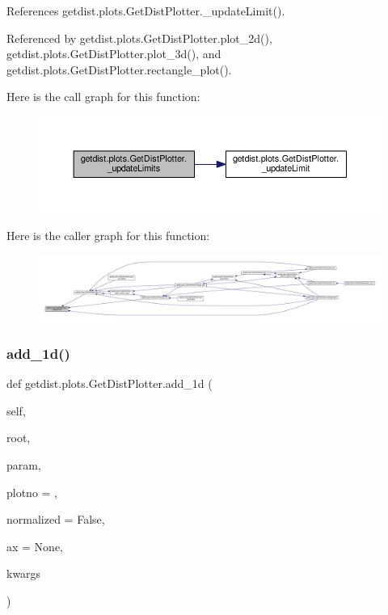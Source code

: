 References getdist.\+plots.\+Get\+Dist\+Plotter.\+\_\+update\+Limit().



Referenced by getdist.\+plots.\+Get\+Dist\+Plotter.\+plot\+\_\+2d(), getdist.\+plots.\+Get\+Dist\+Plotter.\+plot\+\_\+3d(), and getdist.\+plots.\+Get\+Dist\+Plotter.\+rectangle\+\_\+plot().

Here is the call graph for this function\+:
\nopagebreak
\begin{figure}[H]
\begin{center}
\leavevmode
\includegraphics[width=350pt]{classgetdist_1_1plots_1_1GetDistPlotter_aa39ae5fcf55546a48cc27bc838ca04ff_cgraph}
\end{center}
\end{figure}
Here is the caller graph for this function\+:
\nopagebreak
\begin{figure}[H]
\begin{center}
\leavevmode
\includegraphics[width=350pt]{classgetdist_1_1plots_1_1GetDistPlotter_aa39ae5fcf55546a48cc27bc838ca04ff_icgraph}
\end{center}
\end{figure}
\mbox{\label{classgetdist_1_1plots_1_1GetDistPlotter_a2c75c431ff53d33697077671d1da1396}} 
\subsubsection{\texorpdfstring{add\+\_\+1d()}{add\_1d()}}
{\footnotesize\ttfamily def getdist.\+plots.\+Get\+Dist\+Plotter.\+add\+\_\+1d (\begin{DoxyParamCaption}\item[{}]{self,  }\item[{}]{root,  }\item[{}]{param,  }\item[{}]{plotno = {},  }\item[{}]{normalized = {\ttfamily False},  }\item[{}]{ax = {\ttfamily None},  }\item[{}]{kwargs }\end{DoxyParamCaption})}

